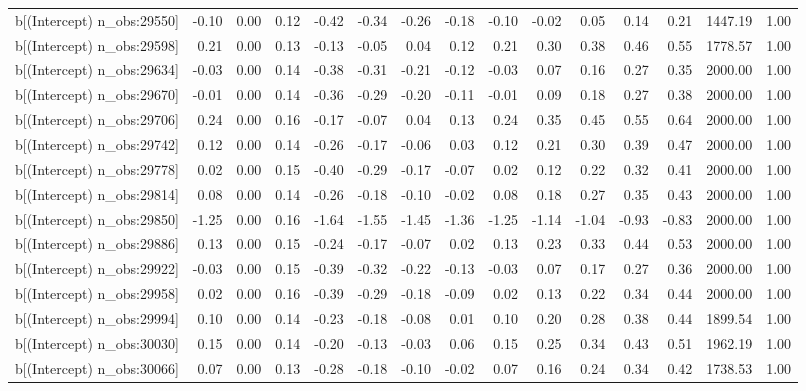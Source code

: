 \begin{table}[ht]
\begin{tabular}{rrrrrrrrrrrrrrr}
  b[(Intercept) n\_obs:29550] & -0.10 & 0.00 & 0.12 & -0.42 & -0.34 & -0.26 & -0.18 & -0.10 & -0.02 & 0.05 & 0.14 & 0.21 & 1447.19 & 1.00 \\ 
  b[(Intercept) n\_obs:29598] & 0.21 & 0.00 & 0.13 & -0.13 & -0.05 & 0.04 & 0.12 & 0.21 & 0.30 & 0.38 & 0.46 & 0.55 & 1778.57 & 1.00 \\ 
  b[(Intercept) n\_obs:29634] & -0.03 & 0.00 & 0.14 & -0.38 & -0.31 & -0.21 & -0.12 & -0.03 & 0.07 & 0.16 & 0.27 & 0.35 & 2000.00 & 1.00 \\ 
  b[(Intercept) n\_obs:29670] & -0.01 & 0.00 & 0.14 & -0.36 & -0.29 & -0.20 & -0.11 & -0.01 & 0.09 & 0.18 & 0.27 & 0.38 & 2000.00 & 1.00 \\ 
  b[(Intercept) n\_obs:29706] & 0.24 & 0.00 & 0.16 & -0.17 & -0.07 & 0.04 & 0.13 & 0.24 & 0.35 & 0.45 & 0.55 & 0.64 & 2000.00 & 1.00 \\ 
  b[(Intercept) n\_obs:29742] & 0.12 & 0.00 & 0.14 & -0.26 & -0.17 & -0.06 & 0.03 & 0.12 & 0.21 & 0.30 & 0.39 & 0.47 & 2000.00 & 1.00 \\ 
  b[(Intercept) n\_obs:29778] & 0.02 & 0.00 & 0.15 & -0.40 & -0.29 & -0.17 & -0.07 & 0.02 & 0.12 & 0.22 & 0.32 & 0.41 & 2000.00 & 1.00 \\ 
  b[(Intercept) n\_obs:29814] & 0.08 & 0.00 & 0.14 & -0.26 & -0.18 & -0.10 & -0.02 & 0.08 & 0.18 & 0.27 & 0.35 & 0.43 & 2000.00 & 1.00 \\ 
  b[(Intercept) n\_obs:29850] & -1.25 & 0.00 & 0.16 & -1.64 & -1.55 & -1.45 & -1.36 & -1.25 & -1.14 & -1.04 & -0.93 & -0.83 & 2000.00 & 1.00 \\ 
  b[(Intercept) n\_obs:29886] & 0.13 & 0.00 & 0.15 & -0.24 & -0.17 & -0.07 & 0.02 & 0.13 & 0.23 & 0.33 & 0.44 & 0.53 & 2000.00 & 1.00 \\ 
  b[(Intercept) n\_obs:29922] & -0.03 & 0.00 & 0.15 & -0.39 & -0.32 & -0.22 & -0.13 & -0.03 & 0.07 & 0.17 & 0.27 & 0.36 & 2000.00 & 1.00 \\ 
  b[(Intercept) n\_obs:29958] & 0.02 & 0.00 & 0.16 & -0.39 & -0.29 & -0.18 & -0.09 & 0.02 & 0.13 & 0.22 & 0.34 & 0.44 & 2000.00 & 1.00 \\ 
  b[(Intercept) n\_obs:29994] & 0.10 & 0.00 & 0.14 & -0.23 & -0.18 & -0.08 & 0.01 & 0.10 & 0.20 & 0.28 & 0.38 & 0.44 & 1899.54 & 1.00 \\ 
  b[(Intercept) n\_obs:30030] & 0.15 & 0.00 & 0.14 & -0.20 & -0.13 & -0.03 & 0.06 & 0.15 & 0.25 & 0.34 & 0.43 & 0.51 & 1962.19 & 1.00 \\ 
  b[(Intercept) n\_obs:30066] & 0.07 & 0.00 & 0.13 & -0.28 & -0.18 & -0.10 & -0.02 & 0.07 & 0.16 & 0.24 & 0.34 & 0.42 & 1738.53 & 1.00 \\ 

\end{tabular}
\end{table}
